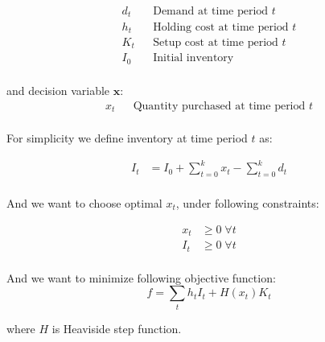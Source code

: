 \begin{align*}
  d_t && \text{Demand at time period $t$} \\
  h_t && \text{Holding cost at time period $t$} \\
  K_t && \text{Setup cost at time period $t$} \\
  I_0 && \text{Initial inventory} \\
\end{align*}

and decision variable $\mathbf{x}$:
\begin{align*}
  x_t && \text{Quantity purchased at time period $t$}\\
\end{align*}

For simplicity we define inventory at time period $t$ as:

\begin{align*}
  I_t &= I_0 + \sum_{t=0}^k{x_t} - \sum_{t=0}^k{d_t}\\
\end{align*}

And we want to choose optimal $x_t$, under following constraints:

\begin{align*}
  x_t &\ge 0 \; \forall t\\
  I_t &\ge 0 \; \forall t\\
\end{align*}

And we want to minimize following objective function:
\begin{equation*}
  f = \sum_t{h_t I_t + H(x_t)K_t}
\end{equation*}

where $H$ is Heaviside step function.
